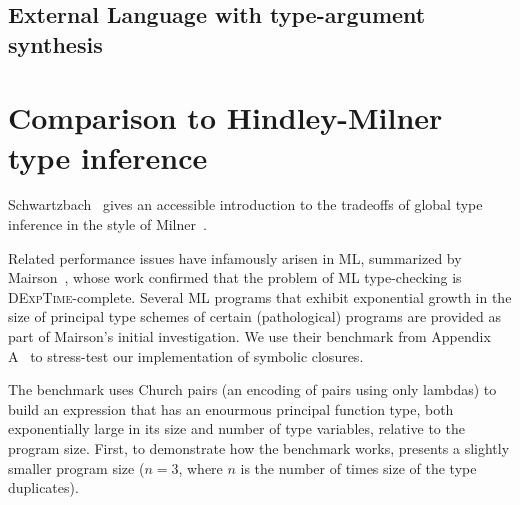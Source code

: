 \subsection{External Language with type-argument synthesis}


\section{Comparison to Hindley-Milner type inference}

Schwartzbach~\cite{schwartzbach1995polymorphic}
gives an accessible introduction to the tradeoffs of
global type inference
in the style of Milner~\cite{milner1978theory}.


Related performance issues have infamously arisen in ML, summarized
by Mairson~\cite{Mairson:1989}, whose work confirmed
that the problem of ML type-checking is \textsc{DExpTime}-complete.
Several ML programs that exhibit exponential
growth in the size of principal type schemes of certain (pathological)
programs are provided as part of Mairson's initial investigation.
We use their benchmark from Appendix A~\cite{Mairson:1989} to stress-test our implementation of symbolic closures.

The benchmark uses Church pairs (an encoding of pairs using only lambdas)
to build an expression that has an enourmous principal function type,
both exponentially large in its size and number of type variables, relative
to the program size.
First, to demonstrate how the benchmark works, 
presents a slightly smaller program size
($n=3$, where $n$ is the number of times size of the type duplicates).


